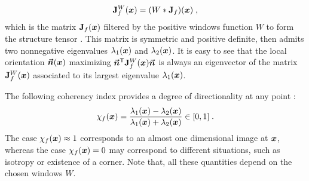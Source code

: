 \documentclass{elsarticle}
\def\vx{\vect{x}}
\begin{document}
\begin{equation}\label{eq:JfW}
\mathbf{J}_f^W(\bm{x})= (W*\mathbf{J}_f)(\bm{x})\;,
\end{equation}
which is the matrix $\mathbf{J}_f(\bm{x})$ filtered by the positive windows function $W$ to form the structure tensor \cite{bigun1987optimal,harris1988combined,jahne2004practical}. This matrix is symmetric and positive definite, then admits two nonnegative eigenvalues $\lambda_1(\vx)$ and $\lambda_2(\vx)$. It is easy to see that the local orientation $\bm{\vec n}(\bm{x})$ maximizing $\bm{\vec n}^{\mathsf{T}}\mathbf{J}_f^W(\bm{x})\bm{\vec n}$ is always an eigenvector of the matrix $\mathbf{J}_f^W(\bm{x})$ associated to its largest eigenvalue $\lambda_1(\vx)$. 

The following coherency index provides a degree of directionality at any point \cite{bigun1987optimal}:
\[
\chi_f(\bm{x})=\frac{{\lambda_{1}(\bm{x})- \lambda_{2}(\bm{x})}}{\lambda_{1}(\bm{x})+\lambda_{2}(\bm{x})}\in [0,1]\;.
\]
The case $\chi_f(\bm{x})\approx1$ corresponds to an almost one dimensional image at $\bm{x}$, whereas the case $\chi_f(\bm{x})=0$ may correspond to different situations, such as isotropy or existence of a corner. Note that, all these quantities depend on the chosen windows $W$.
\end{document}
